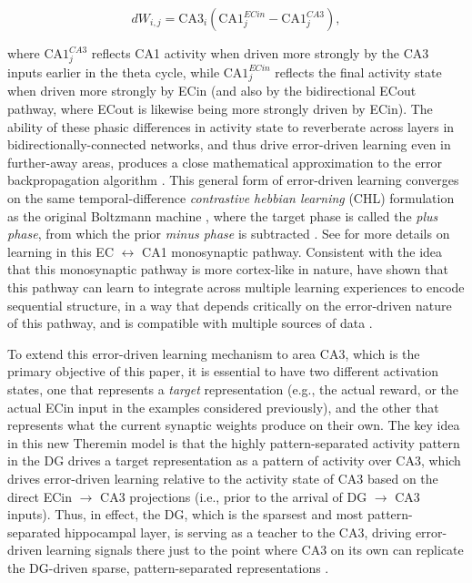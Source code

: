 \documentclass[10pt,letterpaper]{article}
\begin{document}
\begin{equation}
\label{eq.CA1EDL}
    dW_{i,j} = \mbox{CA3}_i ( \mbox{CA1}_j^{ECin} - \mbox{CA1}_j^{CA3} ) ,
\end{equation}

where $\mbox{CA1}_j^{CA3}$ reflects CA1 activity when driven more strongly by the CA3 inputs earlier in the theta cycle, while $\mbox{CA1}_j^{ECin}$ reflects the final activity state when driven more strongly by ECin (and also by the bidirectional ECout pathway, where ECout is likewise being more strongly driven by ECin).  The ability of these phasic differences in activity state to reverberate across layers in bidirectionally-connected networks, and thus drive error-driven learning even in further-away areas, produces a close mathematical approximation to the error backpropagation algorithm \cite{OReilly96,WhittingtonBogacz19,LillicrapSantoroMarrisEtAl20}.  This general form of error-driven learning converges on the same temporal-difference \emph{contrastive hebbian learning} (CHL) formulation as the original Boltzmann machine \cite{AckleyHintonSejnowski85}, where the target phase is called the \emph{plus phase}, from which the prior \emph{minus phase} is subtracted \cite{OReillyMunakataFrankEtAl12,OReillyMunakata00,OReillyRussinZolfagharEtAl21}.  See \cite{KetzMorkondaOReilly13} for more details on learning in this EC $\leftrightarrow$ CA1 monosynaptic pathway.  Consistent with the idea that this monosynaptic pathway is more cortex-like in nature, \cite{SchapiroTurk-BrowneBotvinickEtAl17} have shown that this pathway can learn to integrate across multiple learning experiences to encode sequential structure, in a way that depends critically on the error-driven nature of this pathway, and is compatible with multiple sources of data \cite{SchapiroTurk-BrowneNormanEtAl16}.

To extend this error-driven learning mechanism to area CA3, which is the primary objective of this paper, it is essential to have two different activation states, one that represents a \emph{target} representation (e.g., the actual reward, or the actual ECin input in the examples considered previously), and the other that represents what the current synaptic weights produce on their own.  The key idea in this new Theremin model is that the highly pattern-separated activity pattern in the DG drives a target representation as a pattern of activity over CA3, which drives error-driven learning relative to the activity state of CA3 based on the direct ECin $\rightarrow$ CA3 projections (i.e., prior to the arrival of DG $\rightarrow$ CA3 inputs).  Thus, in effect, the DG, which is the sparsest and most pattern-separated hippocampal layer, is serving as a teacher to the CA3, driving error-driven learning signals there just to the point where CA3 on its own can replicate the DG-driven sparse, pattern-separated representations \cite{KowadloAhmedRawlinson20}.
\end{document}
